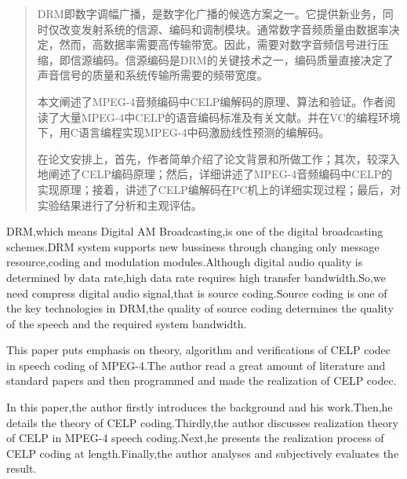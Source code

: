 
\begin{abstract}
DRM即数字调幅广播，是数字化广播的候选方案之一。它提供新业务，同时仅改变发射系统的信源、编码和调制模块。通常数字音频质量由数据率决定，然而，高数据率需要高传输带宽。因此，需要对数字音频信号进行压缩，即信源编码。信源编码是DRM的关键技术之一，编码质量直接决定了声音信号的质量和系统传输所需要的频带宽度。

本文阐述了MPEG-4音频编码中CELP编解码的原理、算法和验证。作者阅读了大量MPEG-4中CELP的语音编码标准及有关文献。并在VC的编程环境下，用C语言编程实现MPEG-4中码激励线性预测的编解码。

在论文安排上，首先，作者简单介绍了论文背景和所做工作；其次，较深入地阐述了CELP编码原理；然后，详细讲述了MPEG-4音频编码中CELP的实现原理；接着，讲述了CELP编解码在PC机上的详细实现过程；最后，对实验结果进行了分析和主观评估。

\end{abstract}

\begin{englishabstract}
DRM,which means Digital AM Broadcasting,is one of the digital broadcasting schemes.DRM system supports new bussiness through changing only message resource,coding and modulation modules.Although digital audio quality is determined by data rate,high data rate requires high transfer bandwidth.So,we need compress digital audio signal,that is source coding.Source coding is one of the key technologies in DRM,the quality of source coding determines the quality of the speech and the required system bandwidth.

This paper puts emphasis on theory, algorithm and verifications of CELP codec in speech coding of MPEG-4.The author read a great amount of literature and standard papers and then programmed and made the realization of CELP codec.

In this paper,the author firstly introduces the background and his work.Then,he details the theory of CELP coding.Thirdly,the author discusses realization theory of CELP in MPEG-4 speech coding.Next,he presents the realization process of CELP coding at length.Finally,the author analyses and subjectively evaluates the result.
   

\end{englishabstract}
